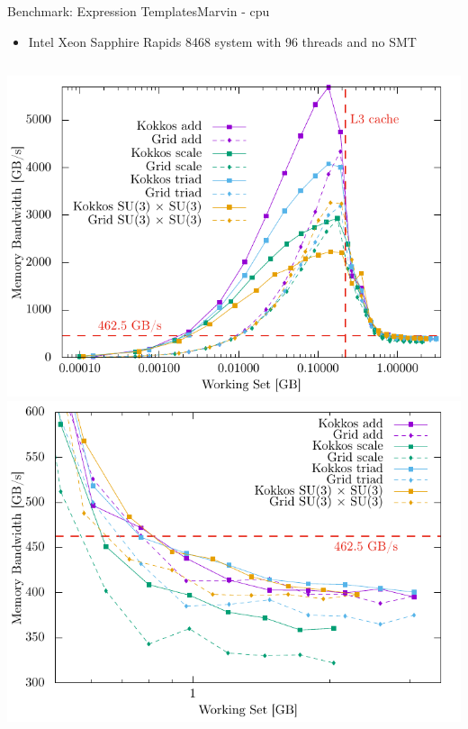 \begin{frame}{Benchmark: Expression Templates}{Marvin - cpu}

  \begin{itemize}
    \item Intel Xeon Sapphire Rapids 8468 system with 96 threads and no SMT
  \end{itemize}

  \begin{columns}
      \includegraphics[width=\textwidth]{figs/marvin_results.pdf}
      \includegraphics[width=\textwidth]{figs/marvin_results_zoom.pdf}
  \end{columns}
\end{frame}

